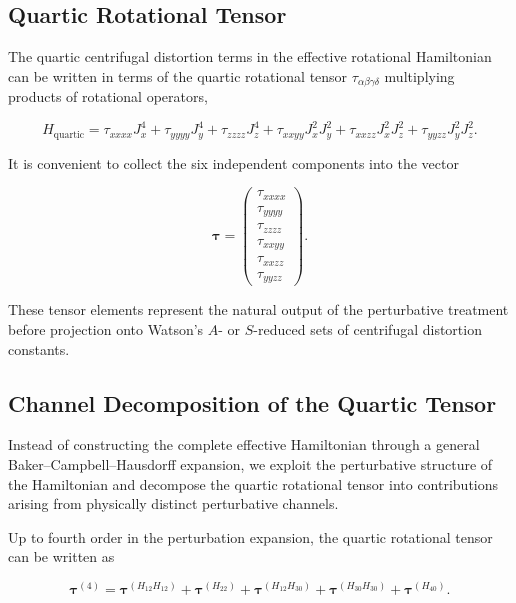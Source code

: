 \documentclass[aip,jcp,reprint]{revtex4-2}
\begin{document}
\subsection{Quartic Rotational Tensor}

The quartic centrifugal distortion terms in the effective rotational
Hamiltonian can be written in terms of the quartic rotational tensor
$\tau_{\alpha\beta\gamma\delta}$ multiplying products of rotational
operators,

\begin{equation}
H_{\mathrm{quartic}} =
\tau_{xxxx} J_x^4
+
\tau_{yyyy} J_y^4
+
\tau_{zzzz} J_z^4
+
\tau_{xxyy} J_x^2 J_y^2
+
\tau_{xxzz} J_x^2 J_z^2
+
\tau_{yyzz} J_y^2 J_z^2 .
\end{equation}

It is convenient to collect the six independent components into the
vector

\begin{equation}
\bm{\tau} =
\begin{pmatrix}
\tau_{xxxx} \\
\tau_{yyyy} \\
\tau_{zzzz} \\
\tau_{xxyy} \\
\tau_{xxzz} \\
\tau_{yyzz}
\end{pmatrix}.
\end{equation}

These tensor elements represent the natural output of the perturbative
treatment before projection onto Watson's $A$- or $S$-reduced sets of
centrifugal distortion constants.\cite{Watson1968,Watson1977,Mills1972}

\subsection{Channel Decomposition of the Quartic Tensor}

Instead of constructing the complete effective Hamiltonian through a
general Baker--Campbell--Hausdorff expansion, we exploit the perturbative
structure of the Hamiltonian and decompose the quartic rotational tensor
into contributions arising from physically distinct perturbative
channels.

Up to fourth order in the perturbation expansion, the quartic rotational
tensor can be written as

\begin{equation}
\bm{\tau}^{(4)} =
\bm{\tau}^{(H_{12}H_{12})}
+
\bm{\tau}^{(H_{22})}
+
\bm{\tau}^{(H_{12}H_{30})}
+
\bm{\tau}^{(H_{30}H_{30})}
+
\bm{\tau}^{(H_{40})}.
\end{equation}
\end{document}
